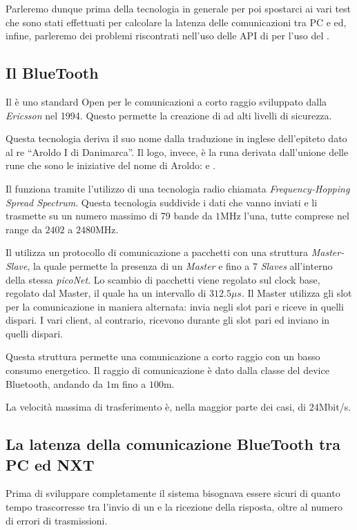 Parleremo dunque prima della tecnologia in generale per poi spostarci ai
vari test che sono stati effettuati per calcolare la latenza delle
comunicazioni tra PC e \SPAM{} ed, infine, parleremo dei problemi
riscontrati nell'uso delle API di \nxtOSEK{} per l'uso del
.

\subsection{Il BlueTooth}
Il  è uno standard Open per le comunicazioni a corto
raggio sviluppato dalla \emph{Ericsson} nel 1994. Questo permette la creazione di
 ad alti livelli di sicurezza.

Questa tecnologia deriva il suo nome dalla traduzione in inglese
dell'epiteto dato al re ``Aroldo I di Danimarca''. Il logo, invece, è la
runa derivata dall'unione delle rune che sono le iniziative del nome di
Aroldo:  e .

Il  funziona tramite l'utilizzo di una tecnologia radio
chiamata \emph{Frequency-Hopping Spread Spectrum}. Questa tecnologia
suddivide i dati che vanno inviati e li trasmette su un numero massimo di
79 bande da $1$MHz l'una, tutte comprese nel range da $2402$ a $2480$MHz.

Il  utilizza un protocollo di comunicazione a pacchetti
con una struttura \emph{Master-Slave}, la quale permette la presenza di un
\emph{Master} e fino a $7$ \emph{Slaves} all'interno della stessa
\emph{picoNet}. Lo scambio di pacchetti viene regolato sul clock base,
regolato dal Master, il quale ha un intervallo di $312.5\mu{}s$. Il Master
utilizza gli slot per la comunicazione in maniera alternata: invia negli
slot pari e riceve in quelli dispari. I vari client, al contrario, ricevono
durante gli slot pari ed inviano in quelli dispari.

Questa struttura permette una comunicazione a corto raggio con un basso
consumo energetico. Il raggio di comunicazione è dato dalla classe del
device Bluetooth, andando da $1$m fino a $100$m.

La velocità massima di trasferimento è, nella maggior parte dei casi, di
$24$Mbit/s.

\subsection{La latenza della comunicazione BlueTooth tra PC ed
NXT}\label{sec:BROTooth} 
Prima di sviluppare completamente il sistema bisognava essere sicuri di
quanto tempo trascorresse tra l'invio di un \BROFist{} e la ricezione della
risposta, oltre al numero di errori di trasmissioni.

